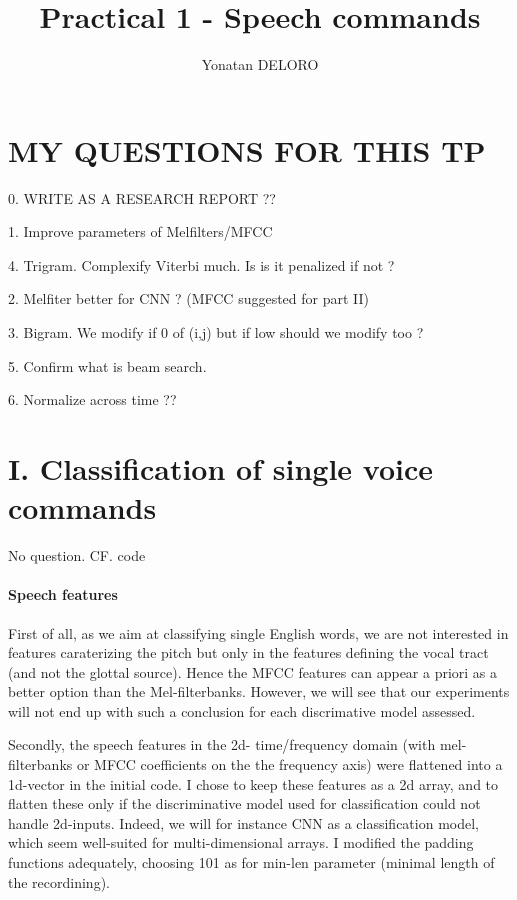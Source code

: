 \documentclass[11pt]{article}
\title{Practical 1 - Speech commands}
\author{Yonatan DELORO}
\begin{document}
\maketitle

\section{MY QUESTIONS FOR THIS TP}

0. WRITE AS A RESEARCH REPORT ??

1. Improve parameters of Melfilters/MFCC

4. Trigram. Complexify Viterbi much. Is is it penalized if not ?

2. Melfiter better for CNN ? (MFCC suggested for part II)

3. Bigram. We modify if 0 of (i,j) but if low should we modify too ?

5. Confirm what is beam search.

6. Normalize across time ??

\section{I. Classification of single voice commands}

No question. CF. code

\paragraph{Speech features}

First of all, as we aim at classifying single English words, we are not interested in features caraterizing the pitch but only in the features defining the vocal tract (and not the glottal source). Hence the MFCC features can appear a priori as a better option than the Mel-filterbanks. However, we will see that our experiments will not end up with such a conclusion for each discrimative model assessed.

Secondly, the speech features in the 2d- time/frequency domain (with mel-filterbanks or MFCC coefficients on the the frequency axis) were flattened into a 1d-vector in the initial code. I chose to keep these features as a 2d array, and to flatten these only if the discriminative model used for classification could not handle 2d-inputs. Indeed, we will for instance CNN as a classification model, which seem well-suited for multi-dimensional arrays. I modified the padding functions adequately, choosing 101 as for min-len parameter (minimal length of the recordining).
\end{document}
